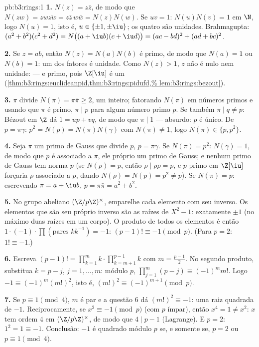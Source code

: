 \begin{solution}{pb:b3:rings:1}
\textbf{1.} $N(z) = z\bar z$, de modo que $N(zw) = zw\overline{zw} = z\bar
z\, w \bar w = N(z)N(w)$. Se $uv = 1$: $N(u)N(v) = 1$ em $\N$,
logo $N(u) = 1$, isto é, $u \in \{\pm 1, \pm \iu\}$; os quatro são unidades. Brahmagupta: $(a^2+b^2)(c^2+d^2) = N\bigl((a + \iu b)(c + \iu
d)\bigr) = (ac - bd)^2 + (ad + bc)^2$.

\textbf{2.} Se $z = ab$, então $N(z) = N(a)N(b)$ é primo, de modo que $N(a) = 1$ ou
$N(b) = 1$: um dos fatores é unidade. Como $N(z) > 1$, $z$ não é nulo nem
unidade:  --- e primo, pois $\Z[\iu]$ é um  (\cref{thm:b3:rings:euclideanpid,thm:b3:rings:pidufd,%
lem:b3:rings:bezout}).

\textbf{3.} $\pi$ divide $N(\pi) = \pi\bar\pi \geq 2$, um inteiro; fatorando $N(\pi)$
em números primos e usando que $\pi$ é primo, $\pi \mid p$ para algum número
primo $p$. Se também $\pi \mid q \neq p$: Bézout em $\Z$ dá $1 = up + vq$, de modo que
$\pi \mid 1$ --- absurdo: $p$ é único. De $p = \pi\gamma$: $p^2 = N(p) = N(\pi)N(\gamma)$ com $N(\pi) \neq 1$, logo $N(\pi)
\in \{p, p^2\}$.

\textbf{4.} Seja $\pi$ um primo de Gauss que divide $p$, $p =
\pi\gamma$.
Se $N(\pi) = p^2$: $N(\gamma) = 1$, de modo que $p$ é associado a $\pi$, ele próprio
um primo de Gauss; e nenhum primo de Gauss tem norma $p$ (se $N(\rho) = p$,
então $\rho \mid
\rho\bar\rho = p$, e $p$ primo em $\Z[\iu]$ forçaria $\rho$ associado a
$p$, dando $N(\rho) = N(p) = p^2 \neq
p$). Se $N(\pi) = p$: escrevendo $\pi = a + \iu b$, $p = \pi\bar\pi = a^2
+ b^2$.

\textbf{5.} No grupo abeliano $(\Z/p\Z)^\times$, emparelhe cada elemento com seu
inverso. Os elementos que são seu próprio inverso são as raízes de
$X^2 - 1$: exatamente $\pm 1$ (no máximo duas raízes em um corpo). O
produto de todos os elementos é então $1 \cdot (-1) \cdot \prod
(\text{pares } k k^{-1}) = -1$: $(p-1)! \equiv -1 \pmod p$. (Para $p = 2$:
$1! \equiv -1$.)

\textbf{6.} Escreva $(p-1)! = \prod_{k=1}^m k \cdot
\prod_{k=m+1}^{p-1}k$ com $m = \frac{p-1}2$. No segundo produto, substitua
$k = p - j$, $j = 1, \dots, m$: módulo $p$, $\prod_{j=1}^m (p - j) \equiv (-1)^m m!$. Logo $-1 \equiv
(-1)^m (m!)^2$, isto é, $(m!)^2 \equiv (-1)^{m+1} \pmod p$.

\textbf{7.} Se $p \equiv 1 \pmod 4$, $m$ é par e a questão 6 dá $(m!)^2 \equiv -1$: uma raiz
quadrada de $-1$. Reciprocamente, se $x^2 \equiv -1 \pmod p$ (com $p$ ímpar), então
$x^4 = 1 \neq x^2$: $x$ tem ordem $4$ em $(\Z/p\Z)^\times$, de modo que $4 \mid p - 1$ (Lagrange).
E $p = 2$: $1^2 = 1 \equiv -1$. Conclusão: $-1$ é quadrado módulo $p$ se, e
somente se, $p = 2$ ou $p \equiv 1 \pmod 4$.


\end{solution}
